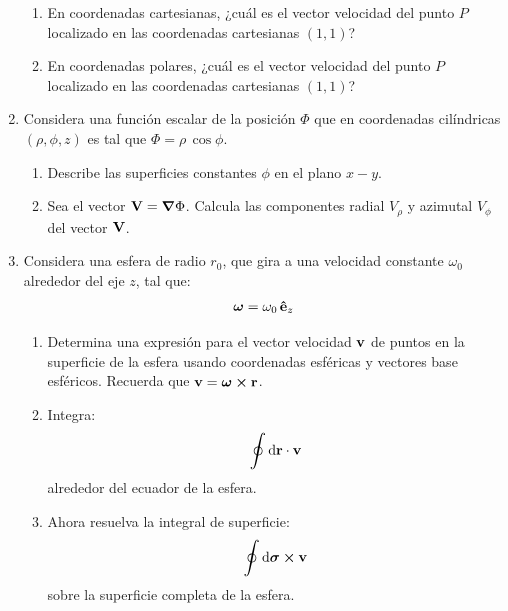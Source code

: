 \documentclass[hidelinks,12pt]{article}
\def\scaleoint#1{\vcenter{\hbox{\scaleto[3ex]{\displaystyle\oint}{#1}}}}
\begin{document}
\begin{enumerate}
\begin{enumerate}[label=\alph*)]
\item En coordenadas cartesianas, ¿cuál es el vector velocidad del punto $P$ localizado en las coordenadas cartesianas $(1, 1)$?
\item En coordenadas polares, ¿cuál es el vector velocidad del punto $P$ localizado en las coordenadas cartesianas $(1, 1)$?
\end{enumerate}
\item Considera una función escalar de la posición $\Phi$ que en coordenadas cilíndricas $(\rho, \phi, z)$ es tal que $\Phi = \rho \, \cos \phi$.
\begin{enumerate}[label=\roman*)]
\item Describe las superficies constantes $\phi$ en el plano $x-y$.
\item Sea el vector $\vb{V} = \grad{\Phi}$. Calcula las componentes radial $V_{\rho}$ y azimutal $V_{\phi}$ del vector $\vb{V}$.
\end{enumerate} 
\item Considera una esfera de radio $r_{0}$, que gira a una velocidad constante $\omega_{0}$ alrededor del eje $z$, tal que:
\begin{align*}
\bm{\omega} = \omega_{0} \, \vu{e}_{z}
\end{align*}
\begin{enumerate}[label=\alph*)]
\item Determina una expresión para el vector velocidad $\vb{v}$ de puntos en la superficie de la esfera usando coordenadas esféricas y vectores base esféricos. Recuerda que $\vb{v} = \bm{\omega} \cp \vb{r}$.
\item Integra:
\begin{align*}
\scaleoint{6ex} \dd{\vb{r}} \cdot \vb{v}
\end{align*}
alrededor del ecuador de la esfera.
\item Ahora resuelva la integral de superficie:
\begin{align*}
\scaleoint{6ex} \dd{\bm{\sigma}} \cp \vb{v}
\end{align*}
sobre la superficie completa de la esfera.
\end{enumerate}


\end{enumerate}
\end{document}
